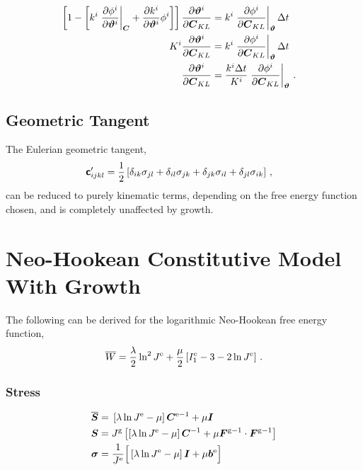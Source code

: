 \documentclass[10pt,letterpaper,oneside]{report}
\newcommand{\ten}[1]{\mbox{\boldmath $#1$}{}}
\newcommand{\tenf}[1]{\mbox{{\sffamily{\bfseries {#1}}}}}
\newcommand{\scas}[1]{\mbox{{\scriptsize{${\rm{#1}}$}}}{}}
\newcommand{\tens}[1]{\mbox{\boldmath{\scriptsize{$#1$}}}{}}
\begin{document}
\begin{itemize}
\begin{align}
\notag \\
\left[ 1 - \left[ k^i \left. \frac{\partial \phi^i }{\partial \ten{\vartheta}^i} \right|_{\tens{C}} + \frac{\partial k^i }{\partial \ten{\vartheta}^i} \phi^i \right] \right] \frac{\partial \ten{\vartheta}^i }{\partial \ten{C}_{KL} } 
={}& k^i \left. \frac{\partial \phi^i }{\partial \ten{C}_{KL} } \right|_{\tens{\vartheta} } \Delta t 
\notag \\
K^i \frac{\partial \ten{\vartheta}^i }{\partial \ten{C}_{KL} } 
={}& k^i \left. \frac{\partial \phi^i }{\partial \ten{C}_{KL} } \right|_{\tens{\vartheta} } \Delta t 
\notag \\
\frac{\partial \ten{\vartheta}^i }{\partial \ten{C}_{KL} } 
={}& \frac{k^i \Delta t}{K^i} \left. \frac{\partial \phi^i }{\partial \ten{C}_{KL} } \right|_{\tens{\vartheta} } \, . 
\end{align}


\subsection{Geometric Tangent}
The Eulerian geometric tangent, 
\begin{align}
\tenf{c}'_{ijkl} ={}& \frac{1}{2} \left[ \delta_{ik}\sigma_{jl} + \delta_{il}\sigma_{jk} + \delta_{jk}\sigma_{il} + \delta_{jl}\sigma_{ik} \right] \, , 
\end{align}
can be reduced to purely kinematic terms, depending on the free energy function chosen, and is completely unaffected by growth.


\newpage
\section{Neo-Hookean Constitutive Model With Growth}
The following can be derived for the logarithmic Neo-Hookean free energy function, 
\begin{equation}
\overline{W} = \frac{\lambda}{2} \ln^2 J^{\scas{e}} + \frac{\mu}{2} \left[ I_1^{\scas{e}} - 3 - 2 \ln J^{\scas{e}} \right] \, . 
\end{equation}
\subsubsection{Stress}
\begin{align}
\overline{\ten{S}} ={}& \left[ \lambda \ln J^{\scas{e}} - \mu \right] \ten{C}^{\scas{e}-1} + \mu \ten{I} 
\\
\ten{S} ={}& J^{\scas{g}} \left[ \left[ \lambda \ln J^{\scas{e}} - \mu \right] \ten{C}^{-1} + \mu \ten{F}^{\scas{g}-1} \cdot \ten{F}^{\scas{g}-1} \right] 
\\
\ten{\sigma} ={}& \frac{1}{J^{\scas{e}}} \Big[ \left[ \lambda \ln J^{\scas{e}} - \mu \right] \ten{I} + \mu \ten{b}^{\scas{e}} \Big]
\end{align}


\end{itemize}
\end{document}
